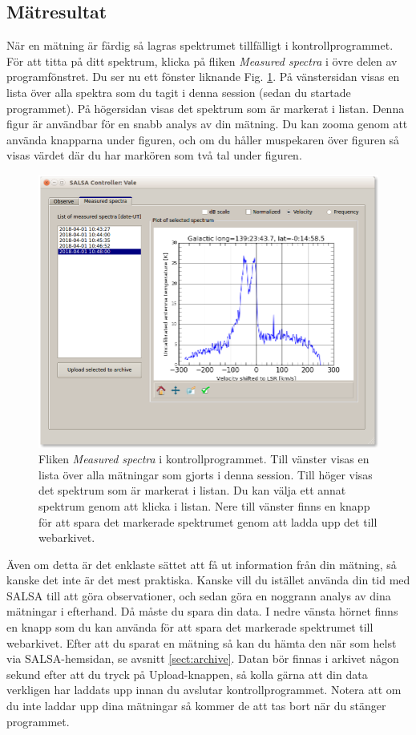 \subsection{Mätresultat}
\label{sect:inspect}
När en mätning är färdig så lagras spektrumet tillfälligt i kontrollprogrammet. 
För att titta på ditt spektrum, klicka på fliken \emph{Measured spectra} i 
övre delen av programfönstret. Du ser nu ett fönster liknande Fig.  
\ref{fig:controlspectra}. På vänstersidan visas en lista över alla spektra som du
tagit i denna session (sedan du startade programmet). På högersidan visas det spektrum
som är markerat i listan. Denna figur är användbar för en snabb analys av din mätning. 
Du kan zooma genom att använda knapparna under figuren, och om du håller muspekaren
över figuren så visas värdet där du har markören som två tal under figuren. 
\begin{figure}[ht]
\begin{center}
\includegraphics[width=\textwidth]{../figures/Controller_spectra.png}
\end{center}
\caption{Fliken \emph{Measured spectra} i kontrollprogrammet. Till vänster
	visas en lista över alla mätningar som gjorts i denna session. Till höger 
	visas det spektrum som är markerat i listan. Du kan välja ett annat spektrum
	genom att klicka i listan. Nere till vänster finns en knapp för att spara
	det markerade spektrumet genom att ladda upp det till webarkivet. 
}
\label{fig:controlspectra}
\end{figure}
Även om detta är det enklaste sättet att få ut information från din mätning,
så kanske det inte är det mest praktiska. Kanske vill du istället använda din tid
med SALSA till att göra observationer, och sedan göra en noggrann analys av dina
mätningar i efterhand. Då måste du spara din data. I nedre vänsta hörnet finns en 
knapp som du kan använda för att spara det markerade spektrumet till webarkivet.
Efter att du sparat en mätning så kan du hämta den när som helst via SALSA-hemsidan,
se avsnitt \ref{sect:archive}. Datan bör finnas i arkivet någon sekund
efter att du tryck på Upload-knappen, så kolla gärna att din data verkligen 
har laddats upp innan du avslutar kontrollprogrammet. Notera att om du inte 
laddar upp dina mätningar så kommer de att tas bort när du stänger programmet.
